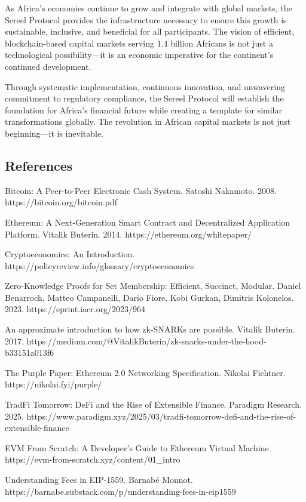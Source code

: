 \documentclass[12pt]{article}
\begin{document}
As Africa's economies continue to grow and integrate with global markets, the Sereel Protocol provides the infrastructure necessary to ensure this growth is sustainable, inclusive, and beneficial for all participants. The vision of efficient, blockchain-based capital markets serving 1.4 billion Africans is not just a technological possibility—it is an economic imperative for the continent's continued development.

Through systematic implementation, continuous innovation, and unwavering commitment to regulatory compliance, the Sereel Protocol will establish the foundation for Africa's financial future while creating a template for similar transformations globally. The revolution in African capital markets is not just beginning—it is inevitable.

\subsection{References} %

Bitcoin: A Peer-to-Peer Electronic Cash System. Satoshi Nakamoto. 2008. https://bitcoin.org/bitcoin.pdf

Ethereum: A Next-Generation Smart Contract and Decentralized Application Platform. Vitalik Buterin. 2014. https://ethereum.org/whitepaper/

Cryptoeconomics: An Introduction. https://policyreview.info/glossary/cryptoeconomics

Zero-Knowledge Proofs for Set Membership: Efficient, Succinct, Modular. Daniel Benarroch, Matteo Campanelli, Dario Fiore, Kobi Gurkan, Dimitris Kolonelos. 2023. https://eprint.iacr.org/2023/964

An approximate introduction to how zk-SNARKs are possible. Vitalik Buterin. 2017. https://medium.com/@VitalikButerin/zk-snarks-under-the-hood-b33151a013f6

The Purple Paper: Ethereum 2.0 Networking Specification. Nikolai Fichtner. https://nikolai.fyi/purple/

TradFi Tomorrow: DeFi and the Rise of Extensible Finance. Paradigm Research. 2025. https://www.paradigm.xyz/2025/03/tradfi-tomorrow-defi-and-the-rise-of-extensible-finance

EVM From Scratch: A Developer's Guide to Ethereum Virtual Machine. https://evm-from-scratch.xyz/content/01_intro

Understanding Fees in EIP-1559. Barnabé Monnot. https://barnabe.substack.com/p/understanding-fees-in-eip1559
\end{document}
